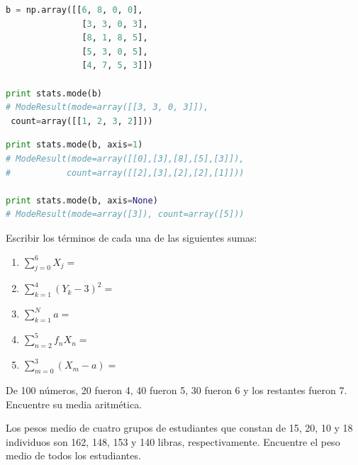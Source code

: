 \begin{lstlisting}[language=Python]
b = np.array([[6, 8, 0, 0],
               [3, 3, 0, 3],
               [8, 1, 8, 5],
               [5, 3, 0, 5],
               [4, 7, 5, 3]])

print stats.mode(b)
# ModeResult(mode=array([[3, 3, 0, 3]]),
 count=array([[1, 2, 3, 2]]))
\end{lstlisting}

\begin{lstlisting}[language=Python]
print stats.mode(b, axis=1)
# ModeResult(mode=array([[0],[3],[8],[5],[3]]),
#           count=array([[2],[3],[2],[2],[1]]))

print stats.mode(b, axis=None)
# ModeResult(mode=array([3]), count=array([5]))
\end{lstlisting}
 
%
 \begin{problema} \label{problema:3.1}
  Escribir los términos de cada una de las siguientes sumas:
  \begin{enumerate}
    \item $\displaystyle\sum_{j=0}^{6}X_{j}=$ 
    \item $\displaystyle\sum_{k=1}^{4}\left( Y_{k}-3 \right)^{2}=$ 
   \item $\displaystyle\sum_{k=1}^{N}a=$ 
   \item $\displaystyle\sum_{n=2}^{5}{f_{n}}X_{n}= $ 
   \item $\displaystyle\sum_{m=0}^{3}\left( X_{m}-a \right)=$
  \end{enumerate}
%
%
 \end{problema}
%
 
 
  \begin{problema}
   \label{problema:3.10}
   De 100 números, 20 fueron 4, 40 fueron 5, 30 fueron 6 y los restantes fueron 7. Encuentre su media aritmética.
  \end{problema}

 

 
  \begin{problema}
   \label{problema:3.13}
   Los pesos medio de cuatro grupos de estudiantes que constan de 15, 20, 10 y 18 individuos son 162, 148, 153 y 140 libras, respectivamente. Encuentre el peso medio de todos los estudiantes.
  \end{problema}

 

%
 
